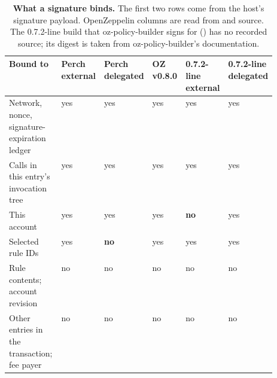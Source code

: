 \begin{table}[tbp]
\centering
\caption{\textbf{What a signature binds.} The first two rows come from the host's signature payload. OpenZeppelin columns are read from   and  source. The 0.7.2-line build that oz-policy-builder signs for () has no recorded source; its digest is taken from oz-policy-builder's documentation.}\label{tab:tab-binding}
\scriptsize\begin{tabularx}{\linewidth}{@{}L*{5}{>{\centering\arraybackslash}p{0.105\linewidth}}@{}}
\toprule
\textbf{Bound to} & \textbf{Perch external} & \textbf{Perch delegated} & \textbf{OZ v0.8.0} & \textbf{0.7.2-line external} & \textbf{0.7.2-line delegated} \\
\midrule
Network, nonce, signature-expiration ledger & yes & yes & yes & yes & yes \\
Calls in this entry's invocation tree & yes & yes & yes & yes & yes \\
This account & yes & yes & yes & \textbf{no} & yes \\
Selected rule IDs & yes & \textbf{no} & yes & yes & yes \\
Rule contents; account revision & no & no & no & no & no \\
Other entries in the transaction; fee payer & no & no & no & no & no \\
\bottomrule
\end{tabularx}
\end{table}
